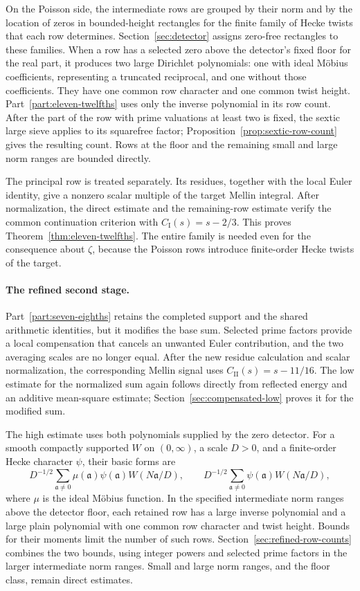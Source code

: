 On the Poisson side, the intermediate rows are grouped by their norm and by
the location of zeros in bounded-height rectangles for the finite family
of Hecke twists that each row determines. Section~\ref{sec:detector} assigns
zero-free rectangles to these families. When a row has a selected zero
above the detector's fixed floor for the real part, it produces two large
Dirichlet polynomials: one with
ideal M\"obius coefficients, representing a truncated reciprocal, and one
without those coefficients. They have one common row character and one
common twist height. Part~\ref{part:eleven-twelfths} uses only the inverse
polynomial in its row count. After the part of the row with prime valuations
at least two is fixed, the sextic large sieve applies to its squarefree
factor; Proposition~\ref{prop:sextic-row-count} gives the resulting count.
Rows at the floor and the remaining small and large norm ranges are bounded
directly.

The principal row is treated separately. Its residues, together with the
local Euler identity, give a nonzero scalar multiple of the target Mellin
integral. After normalization, the direct estimate and the remaining-row
estimate verify the common continuation criterion with
$C_{\mathrm I}(s)=s-2/3$. This proves
Theorem~\ref{thm:eleven-twelfths}. The entire family is needed even for the
consequence about $\zeta$, because the Poisson rows introduce finite-order
Hecke twists of the target.

\paragraph{The refined second stage.}
Part~\ref{part:seven-eighths} retains the completed support and the shared
arithmetic identities, but it modifies the base sum. Selected prime factors
provide a local compensation that cancels an unwanted Euler contribution,
and the two averaging scales are no longer equal. After the new residue
calculation and scalar normalization, the corresponding Mellin signal uses
$C_{\mathrm{II}}(s)=s-11/16$. The low estimate for the normalized sum again
follows directly from reflected energy and an additive mean-square estimate;
Section~\ref{sec:compensated-low} proves it for the modified sum.

The high estimate uses both polynomials supplied by the zero detector.
For a smooth compactly supported $W$ on $(0,\infty)$, a scale $D>0$,
and a finite-order Hecke character $\psi$, their basic forms are
\[
 D^{-1/2}\sum_{\mathfrak a\ne0}\mu(\mathfrak a)\psi(\mathfrak a)
       W(N\mathfrak a/D),\qquad
 D^{-1/2}\sum_{\mathfrak a\ne0}\psi(\mathfrak a)W(N\mathfrak a/D),
\]
where $\mu$ is the ideal M\"obius function. In the specified intermediate
norm ranges above the detector floor, each retained row has a large inverse polynomial and a large plain
polynomial with one common row character and twist height. Bounds for
their moments limit the number of such rows. Section~\ref{sec:refined-row-counts}
combines the two bounds, using integer powers and selected prime factors
in the larger intermediate norm ranges. Small and large norm ranges,
and the floor class, remain direct estimates.


